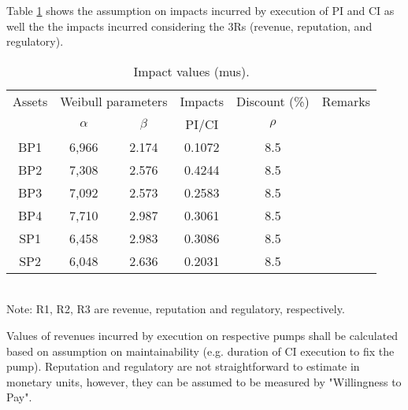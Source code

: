 Table \ref{ch05_tbl_impactvalue01} shows the assumption on impacts incurred by execution of PI and CI as well the the impacts incurred considering the 3Rs (revenue, reputation, and regulatory).

\begin{table}[h]
	\caption{Impact values (mus).}
	\label{ch05_tbl_impactvalue01}
	{\footnotesize
\begin{tabular}{c|c|c|l|l|l}
	\hline
	Assets & \multicolumn{2}{c|}{Weibull parameters} & \multicolumn{1}{c|}{Impacts} & \multicolumn{1}{c|}{Discount (\%)} & Remarks \\ 
	\cline{2-3}
	& $\alpha$ & $\beta$ & \multicolumn{1}{c|}{PI/CI} & \multicolumn{1}{c|}{$\rho$} &  \\ 
	\hline
	BP1 & 6,966 & 2.174 & \multicolumn{1}{c|}{0.1072} & \multicolumn{1}{c|}{8.5} &  \\ 
	BP2 & 7,308 & 2.576 & \multicolumn{1}{c|}{0.4244} & \multicolumn{1}{c|}{8.5} &  \\ 
	BP3 & 7,092 & 2.573 & \multicolumn{1}{c|}{0.2583} & \multicolumn{1}{c|}{8.5} &  \\ 
	BP4 & 7,710 & 2.987 & \multicolumn{1}{c|}{0.3061} & \multicolumn{1}{c|}{8.5} &  \\ 
	SP1 & 6,458 & 2.983 & \multicolumn{1}{c|}{0.3086} & \multicolumn{1}{c|}{8.5} &  \\ 
	SP2 & 6,048 & 2.636 & \multicolumn{1}{c|}{0.2031} & \multicolumn{1}{c|}{8.5} &  \\ 
	\hline
\end{tabular}
\\
Note: R1, R2, R3 are revenue, reputation and regulatory, respectively.
	}
\end{table}

Values of revenues incurred by execution on respective pumps shall be calculated based on assumption on maintainability (e.g. duration of CI execution to fix the pump). Reputation and regulatory are not straightforward to estimate in monetary units, however, they can be assumed to be measured by "Willingness to Pay".

